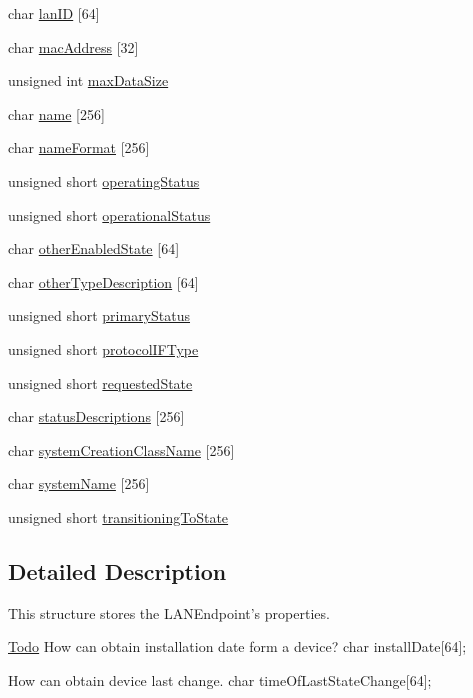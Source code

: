 \begin{DoxyCompactItemize}
\item 
char \hyperlink{struct_l_a_n_endpoint_ab5326c43b317d24e06693427a707553c}{lanID} \mbox{[}64\mbox{]}
\item 
char \hyperlink{struct_l_a_n_endpoint_ad93c6705b6e27c077473da7d9c059d35}{macAddress} \mbox{[}32\mbox{]}
\item 
unsigned int \hyperlink{struct_l_a_n_endpoint_a029105f833e0c92826a6738c6d8f88fd}{maxDataSize}
\item 
char \hyperlink{struct_l_a_n_endpoint_a8e03167ce04350be901b028cc4cf1ce1}{name} \mbox{[}256\mbox{]}
\item 
char \hyperlink{struct_l_a_n_endpoint_a6ae2d79a0b453f2f74f7ed37b65611dc}{nameFormat} \mbox{[}256\mbox{]}
\item 
unsigned short \hyperlink{struct_l_a_n_endpoint_a08774f9e8143e5d2e4e71dac9b13d900}{operatingStatus}
\item 
unsigned short \hyperlink{struct_l_a_n_endpoint_af6ba95b300b99b25169364341eed22cb}{operationalStatus}
\item 
char \hyperlink{struct_l_a_n_endpoint_ada8b1d0abb5f880f6c578111185472d0}{otherEnabledState} \mbox{[}64\mbox{]}
\item 
char \hyperlink{struct_l_a_n_endpoint_ae3a0e27b88cd9e2a8cc4cfe80b63d320}{otherTypeDescription} \mbox{[}64\mbox{]}
\item 
unsigned short \hyperlink{struct_l_a_n_endpoint_a83b43042974812be35c3c4327fc06150}{primaryStatus}
\item 
unsigned short \hyperlink{struct_l_a_n_endpoint_a414e382ad7c2c6ec9c934cfe5ca96dda}{protocolIFType}
\item 
unsigned short \hyperlink{struct_l_a_n_endpoint_a8ef3ed2a286e0d72c33b29dfe265dba3}{requestedState}
\item 
char \hyperlink{struct_l_a_n_endpoint_a575445a261f8e7e135285a85d8263ee2}{statusDescriptions} \mbox{[}256\mbox{]}
\item 
char \hyperlink{struct_l_a_n_endpoint_a71be5890bc11c2285607c8b4770d00ea}{systemCreationClassName} \mbox{[}256\mbox{]}
\item 
char \hyperlink{struct_l_a_n_endpoint_ab9c64e84d8e34eef2de9893fd0628af9}{systemName} \mbox{[}256\mbox{]}
\item 
unsigned short \hyperlink{struct_l_a_n_endpoint_adcee671f36f8f587fd4ea48186bde364}{transitioningToState}
\end{DoxyCompactItemize}


\subsection{Detailed Description}
This structure stores the LANEndpoint's properties. \begin{Desc}
\item[\hyperlink{todo__todo000001}{Todo}]How can obtain installation date form a device? char installDate\mbox{[}64\mbox{]}; 

How can obtain device last change. char timeOfLastStateChange\mbox{[}64\mbox{]}; \end{Desc}


